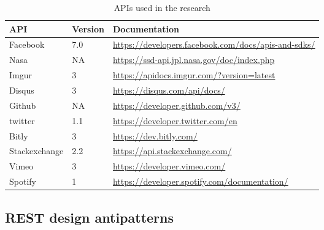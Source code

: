 \documentclass[a4paper,12pt]{article}
\begin{document}
\begin{center}
\begin{table}[!ht]
\begin{tabular}{|p{30mm}|p{15mm}|p{85mm}|}
\hline \textbf{API} & \textbf{Version} & \textbf{Documentation} \\
\hline 
Facebook &
7.0 & 
\url{https://developers.facebook.com/docs/apis-and-sdks/} 
\\ \hline
Nasa &
NA &
\url{https://ssd-api.jpl.nasa.gov/doc/index.php}
\\ \hline
Imgur &
3 & 
\url{https://apidocs.imgur.com/?version=latest}
\\ \hline
Disqus &
3 & 
\url{https://disqus.com/api/docs/}
\\ \hline
Github &
NA & 
\url{https://developer.github.com/v3/}
\\ \hline
twitter &
1.1 & 
\url{https://developer.twitter.com/en}
\\ \hline
Bitly &
3 & 
\url{https://dev.bitly.com/}
\\ \hline
Stackexchange &
2.2 & 
\url{https://api.stackexchange.com/}
\\ \hline
Vimeo &
3 & 
\url{https://developer.vimeo.com/}
\\ \hline
Spotify &
1 & 
\url{https://developer.spotify.com/documentation/}
\\ \hline
\end{tabular}
    \caption{APIs used in the research}
    \label{tab:APIs used in the research}
\end{table}
\end{center}

\subsection{REST design antipatterns}
\end{document}

